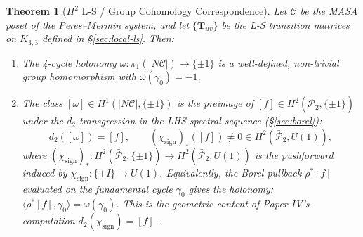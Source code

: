 \documentclass[11pt]{article}
\newtheorem{theorem}{Theorem}[section]
\begin{document}
\begin{theorem}[$H^2$ L-S / Group Cohomology Correspondence]
\label{thm:ls-h2}
Let $\mathcal{C}$ be the MASA poset of the Peres--Mermin system, and let
$\{\mathbf{T}_{uv}\}$ be the L-S transition matrices on $K_{3,3}$ defined
in \S\ref{sec:local-ls}. Then:
\begin{enumerate}
  \item The 4-cycle holonomy $\omega: \pi_1(|N\mathcal{C}|) \to \{\pm 1\}$
    is a well-defined, non-trivial group homomorphism with
    $\omega(\gamma_0) = -1$.
  \item The class $[\omega] \in H^1(|N\mathcal{C}|, \{\pm 1\})$ is the
    preimage of $[f] \in H^2(\bar{\mathcal{P}}_2, \{\pm 1\})$ under the
    $d_2$ transgression in the LHS spectral sequence (\S\ref{sec:borel}):
    \[
    d_2([\omega]) = [f], \qquad
    (\chi_{\text{sign}})_*([f]) \neq 0 \in H^2(\bar{\mathcal{P}}_2, U(1)),
    \]
    where $(\chi_{\text{sign}})_*: H^2(\bar{\mathcal{P}}_2, \{\pm 1\})
    \to H^2(\bar{\mathcal{P}}_2, U(1))$ is the pushforward induced by
    $\chi_{\text{sign}}: \{\pm I\} \to U(1)$. Equivalently, the Borel
    pullback $\rho^*[f]$ evaluated on the fundamental cycle $\gamma_0$
    gives the holonomy:
    $\langle \rho^*[f], \gamma_0 \rangle = \omega(\gamma_0)$.
    This is the geometric content of Paper IV's computation
    $d_2(\chi_{\text{sign}}) = [f]$~\cite{PaperIV}.
\end{enumerate}
\end{theorem}
\end{document}
